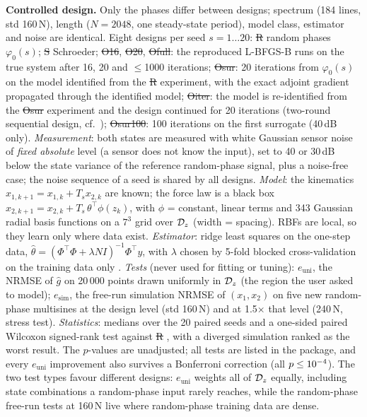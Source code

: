 \textbf{Controlled design.} Only the phases differ between designs; spectrum (184 lines, std 160\,N),
length ($N=2048$, one steady-state period), model class, estimator and noise are identical.
Eight designs per seed $s=1\ldots20$: \st{R} random phases $\varphi_0(s)$; \st{S} Schroeder;
\st{O16}, \st{O20}, \st{Ofull}: the reproduced L-BFGS-B runs on the true system after 16, 20 and
$\le$1000 iterations; \st{Osur}: 20 iterations from $\varphi_0(s)$ on the model identified from the
\st{R} experiment, with the exact adjoint gradient propagated through the identified model;
\st{Oiter}: the model is re-identified from the \st{Osur} experiment and the design continued for 20
iterations (two-round sequential design, cf.\ \citealp{Pronzato2013}); \st{Osur100}: 100 iterations
on the first surrogate (40\,dB only).
\emph{Measurement}: both states are measured with white Gaussian sensor noise of \emph{fixed absolute}
level (a sensor does not know the input), set to 40 or 30\,dB below the state variance of the reference
random-phase signal, plus a noise-free case; the noise sequence of a seed is shared by all designs.
\emph{Model}: the kinematics $x_{1,k+1}=x_{1,k}+T_sx_{2,k}$ are known; the force law is a black box
$x_{2,k+1}=x_{2,k}+T_s\,\theta^\top\phi(z_k)$, with $\phi$ = constant, linear terms and 343 Gaussian
radial basis functions on a $7^3$ grid over $\mathcal{D}_z$ (width = spacing). RBFs are local, so they learn only
where data exist. \emph{Estimator}: ridge least squares on the one-step data,
$\hat\theta=(\Phi^\top\Phi+\lambda N I)^{-1}\Phi^\top y$, with $\lambda$ chosen by 5-fold blocked
cross-validation on the training data only \citep{Ljung1999}.
\emph{Tests} (never used for fitting or tuning): $e_{\mathrm{uni}}$, the NRMSE of $\hat g$ on 20\,000
points drawn uniformly in $\mathcal{D}_z$ (the region the user asked to model); $e_{\mathrm{sim}}$, the free-run
simulation NRMSE of $(x_1,x_2)$ on five new random-phase multisines at the design level (std 160\,N) and
at 1.5$\times$ that level (240\,N, stress test). \emph{Statistics}: medians over the 20 paired seeds and
a one-sided paired Wilcoxon signed-rank test against \st{R} \citep{Wilcoxon1945}, with a diverged simulation
ranked as the worst result. The $p$-values are unadjusted; all \mNTests{} tests are listed in the package,
and every $e_{\mathrm{uni}}$ improvement also survives a Bonferroni correction (all $p\le10^{-4}$).
The two test types favour different designs: $e_{\mathrm{uni}}$ weights all of $\mathcal{D}_z$ equally, including
state combinations a random-phase input rarely reaches, while the random-phase free-run tests at 160\,N live
where random-phase training data are dense.

